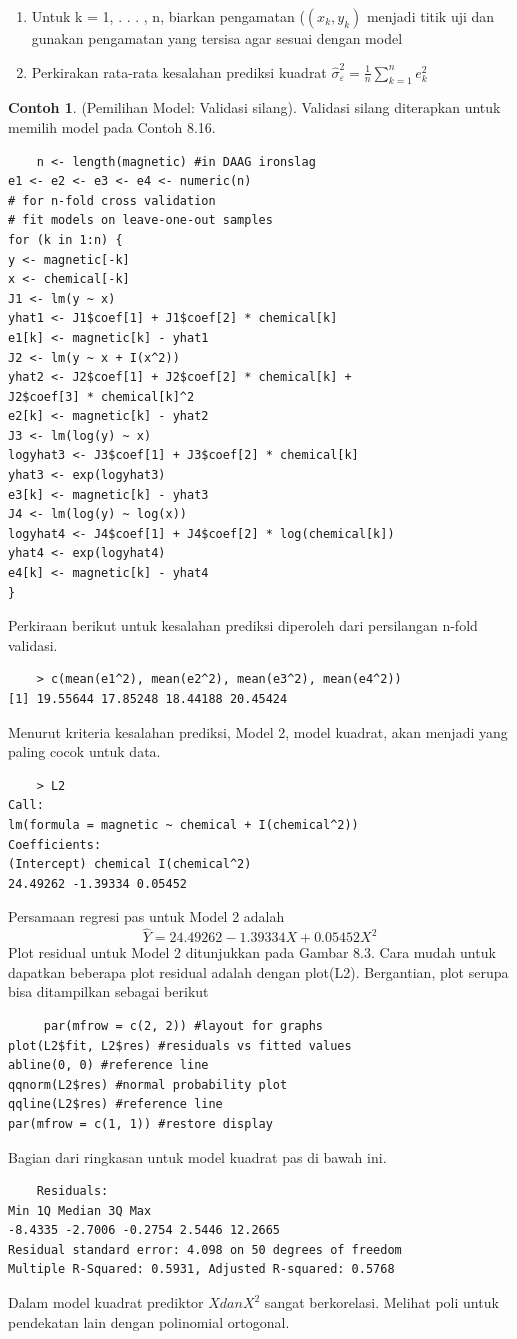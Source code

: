 \documentclass[a4paper,12pt]{article}
\theoremstyle{definition}
\newtheorem{example}{Contoh}[section]
\begin{document}
\begin{enumerate}
    \item Untuk k = 1, . . . , n, biarkan pengamatan ($(x_{k},y_{k})$ menjadi titik uji dan gunakan pengamatan yang tersisa agar sesuai dengan model 
    \item Perkirakan rata-rata kesalahan prediksi kuadrat $\widehat{\sigma }_{\varepsilon }^{2}=\frac{1}{n}\sum_{k=1}^{n} e_{k}^{2}$
\end{enumerate}
\begin{example}
    (Pemilihan Model: Validasi silang). Validasi silang diterapkan untuk memilih model pada Contoh 8.16.
\begin{lstlisting}
    n <- length(magnetic) #in DAAG ironslag
e1 <- e2 <- e3 <- e4 <- numeric(n)
# for n-fold cross validation
# fit models on leave-one-out samples
for (k in 1:n) {
y <- magnetic[-k]
x <- chemical[-k]
J1 <- lm(y ~ x)
yhat1 <- J1$coef[1] + J1$coef[2] * chemical[k]
e1[k] <- magnetic[k] - yhat1
J2 <- lm(y ~ x + I(x^2))
yhat2 <- J2$coef[1] + J2$coef[2] * chemical[k] +
J2$coef[3] * chemical[k]^2
e2[k] <- magnetic[k] - yhat2
J3 <- lm(log(y) ~ x)
logyhat3 <- J3$coef[1] + J3$coef[2] * chemical[k]
yhat3 <- exp(logyhat3)
e3[k] <- magnetic[k] - yhat3
J4 <- lm(log(y) ~ log(x))
logyhat4 <- J4$coef[1] + J4$coef[2] * log(chemical[k])
yhat4 <- exp(logyhat4)
e4[k] <- magnetic[k] - yhat4
}
\end{lstlisting}
Perkiraan berikut untuk kesalahan prediksi diperoleh dari persilangan n-fold validasi.
\begin{lstlisting}
    > c(mean(e1^2), mean(e2^2), mean(e3^2), mean(e4^2))
[1] 19.55644 17.85248 18.44188 20.45424
\end{lstlisting}
Menurut kriteria kesalahan prediksi, Model 2, model kuadrat, akan menjadi yang paling cocok untuk data.
\begin{lstlisting}
    > L2
Call:
lm(formula = magnetic ~ chemical + I(chemical^2))
Coefficients:
(Intercept) chemical I(chemical^2)
24.49262 -1.39334 0.05452
\end{lstlisting}
Persamaan regresi pas untuk Model 2 adalah
\begin{equation*}
    \widehat{Y}=24.49262-1.39334X+0.05452X^{2}
\end{equation*}
Plot residual untuk Model 2 ditunjukkan pada Gambar 8.3. Cara mudah untuk dapatkan beberapa plot residual adalah dengan plot(L2). Bergantian, plot serupa bisa ditampilkan sebagai berikut
 \begin{lstlisting}
     par(mfrow = c(2, 2)) #layout for graphs
plot(L2$fit, L2$res) #residuals vs fitted values
abline(0, 0) #reference line
qqnorm(L2$res) #normal probability plot
qqline(L2$res) #reference line
par(mfrow = c(1, 1)) #restore display
 \end{lstlisting}
Bagian dari ringkasan untuk model kuadrat pas di bawah ini.
\begin{lstlisting}
    Residuals:
Min 1Q Median 3Q Max
-8.4335 -2.7006 -0.2754 2.5446 12.2665
Residual standard error: 4.098 on 50 degrees of freedom
Multiple R-Squared: 0.5931, Adjusted R-squared: 0.5768
\end{lstlisting}
Dalam model kuadrat prediktor $X dan X^{2}$ sangat berkorelasi. Melihat
poli untuk pendekatan lain dengan polinomial ortogonal.
\end{example}
\end{document}
